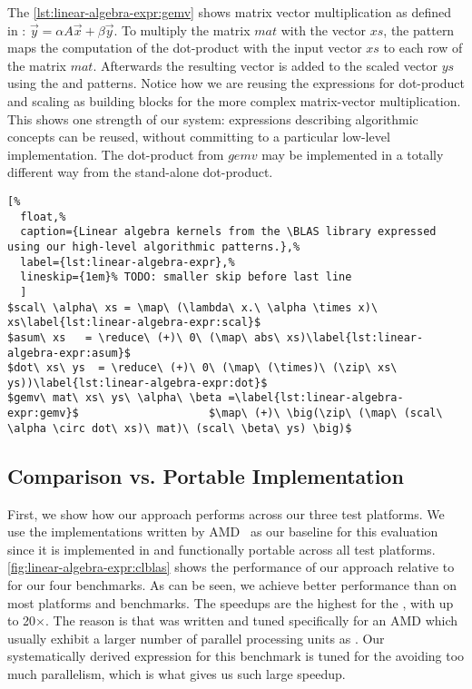 The \autoref{lst:linear-algebra-expr:gemv} shows matrix vector multiplication as defined in \BLAS: $\vec{y} = \alpha A \vec{x} + \beta \vec{y}$.
To multiply the matrix $mat$ with the vector $xs$, the \map pattern maps the computation of the dot-product with the input vector $xs$ to each row of the matrix $mat$.
Afterwards the resulting vector is added to the scaled vector $ys$ using the \zip and \map patterns.
Notice how we are reusing the expressions for dot-product and scaling as building blocks for the more complex matrix-vector multiplication.
This shows one strength of our system: expressions describing algorithmic concepts can be reused, without committing to a particular low-level implementation.
The dot-product from $gemv$ may be implemented in a totally different way from the stand-alone dot-product.

\begin{lstlisting}[%
  float,%
  caption={Linear algebra kernels from the \BLAS library expressed using our high-level algorithmic patterns.},%
  label={lst:linear-algebra-expr},%
  lineskip={1em}% TODO: smaller skip before last line
  ]
$scal\ \alpha\ xs = \map\ (\lambda\ x.\ \alpha \times x)\ xs\label{lst:linear-algebra-expr:scal}$
$asum\ xs   = \reduce\ (+)\ 0\ (\map\ abs\ xs)\label{lst:linear-algebra-expr:asum}$
$dot\ xs\ ys  = \reduce\ (+)\ 0\ (\map\ (\times)\ (\zip\ xs\ ys))\label{lst:linear-algebra-expr:dot}$
$gemv\ mat\ xs\ ys\ \alpha\ \beta =\label{lst:linear-algebra-expr:gemv}$                    $\map\ (+)\ \big(\zip\ (\map\ (scal\ \alpha \circ dot\ xs)\ mat)\ (scal\ \beta\ ys) \big)$
\end{lstlisting}




\subsection{Comparison vs. Portable Implementation}


First, we show how our approach performs across our three test platforms.
We use the \BLAS \OpenCL implementations written by AMD~\cite{clBLAS} as our baseline for this evaluation since it is implemented in \OpenCL and functionally portable across all test platforms.
\autoref{fig:linear-algebra-expr:clblas} shows the performance of our approach relative to \clBLAS for our four benchmarks.
As can be seen, we achieve better performance than \clBLAS on most platforms and benchmarks.
The speedups are the highest for the \CPU, with up to 20$\times$. %
The reason is that \clBLAS was written and tuned specifically for an AMD \GPU which usually exhibit a larger number of parallel processing units as \CPUs.
Our systematically derived expression for this benchmark is tuned for the \CPU avoiding too much parallelism, which is what gives us such large speedup.




